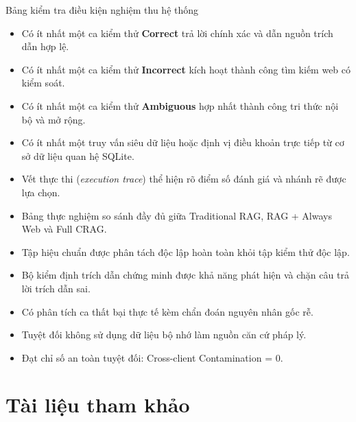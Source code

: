 \begin{calloutbox}{Bảng kiểm tra điều kiện nghiệm thu hệ thống}
\begin{itemize}
    \item Có ít nhất một ca kiểm thử \textbf{Correct} trả lời chính xác và dẫn nguồn trích dẫn hợp lệ.
    \item Có ít nhất một ca kiểm thử \textbf{Incorrect} kích hoạt thành công tìm kiếm web có kiểm soát.
    \item Có ít nhất một ca kiểm thử \textbf{Ambiguous} hợp nhất thành công tri thức nội bộ và mở rộng.
    \item Có ít nhất một truy vấn siêu dữ liệu hoặc định vị điều khoản trực tiếp từ cơ sở dữ liệu quan hệ SQLite.
    \item Vết thực thi (\textit{execution trace}) thể hiện rõ điểm số đánh giá và nhánh rẽ được lựa chọn.
    \item Bảng thực nghiệm so sánh đầy đủ giữa Traditional RAG, RAG + Always Web và Full CRAG.
    \item Tập hiệu chuẩn được phân tách độc lập hoàn toàn khỏi tập kiểm thử độc lập.
    \item Bộ kiểm định trích dẫn chứng minh được khả năng phát hiện và chặn câu trả lời trích dẫn sai.
    \item Có phân tích ca thất bại thực tế kèm chẩn đoán nguyên nhân gốc rễ.
    \item Tuyệt đối không sử dụng dữ liệu bộ nhớ làm nguồn căn cứ pháp lý.
    \item Đạt chỉ số an toàn tuyệt đối: Cross-client Contamination = 0.
\end{itemize}
\end{calloutbox}

\section*{Tài liệu tham khảo}

